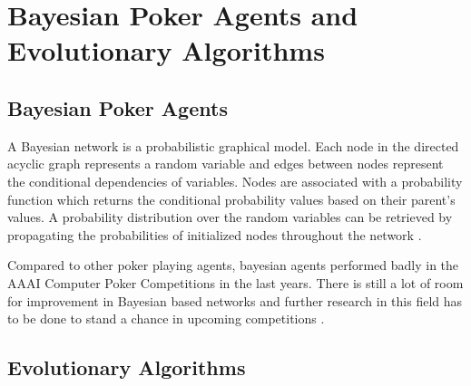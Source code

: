 \section{Bayesian Poker Agents and Evolutionary Algorithms}
\subsection{Bayesian Poker Agents}
A Bayesian network is a probabilistic graphical model. Each node in the directed acyclic graph represents a random variable and edges between nodes represent the conditional dependencies of variables. Nodes are associated with a probability function which returns the conditional probability values based on their parent's values. A probability distribution over the random variables can be retrieved by propagating the probabilities of initialized nodes throughout the network \cite{review}. \par
Compared to other poker playing agents, bayesian agents performed badly in the AAAI Computer Poker Competitions in the last years. There is still a lot of room for improvement in Bayesian based networks and further research in this field has to be done to stand a chance in upcoming competitions \cite{review}. 
\subsection{Evolutionary Algorithms}

